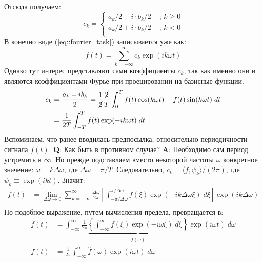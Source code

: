 Отсюда получаем:
\begin{equation}
	c_k = \left\{
	\begin{array}{rl}
		a_k / 2 - i \cdot b_k/ 2  & \text{ ; } k \ge 0\\ 
		a_k / 2 + i \cdot b_k/ 2  & \text{ ; } k < 0\\ 
	\end{array}
	\right.
\end{equation}
В конечно виде (\ref{eq::fourier_task}) записывается уже как:
\begin{equation}
	f(t) = \sum_{k = -\infty}^{\infty} c_k \exp(i k \omega t)
\end{equation}
Однако тут интерес представляют сами коэффициенты $c_k$, так как именно они и являются коэффициентами Фурье при проецировании на базисные функции. 
\begin{equation}
	\begin{split}
		c_k & = \frac{a_k - i b_k}{2} = \frac{1}{\cancel{2}} \frac{\cancel{2}}{T} \int_0^T f(t) \cos(k \omega t) - f(t) \sin(k \omega t) \; dt\\
		& = \frac{1}{2 T} \int_{-T}^T f(t) \exp(-i k \omega t) \; dt
	\end{split}
\end{equation}
Вспоминаем, что ранее вводилась предпосылка, относительно периодичности сигнала $f(t)$. \textbf{Q}: Как быть в противном случае? \textbf{A}: Необходимо сам период устремить к $\infty$. Но прежде подставляем вместо некоторой частоты $\omega$ конкретное значение: $\omega = k \Delta \omega$, где $\Delta \omega = \pi / T$. Следовательно, $c_k = \langle f, \psi_k\rangle / (2 \pi)$, где $\psi_k \equiv \exp(i k t)$. Значит:
\begin{equation}
	\begin{split}
		f(t) & = \lim_{\Delta \omega \to 0} \sum_{k = -\infty}^{\infty} \frac{\Delta \omega}{2 \pi} \left[\int_{-\pi / \Delta \omega}^{\pi / \Delta \omega} f(\xi) \exp(-i k \Delta \omega \xi) \; d \xi\right] \exp(i k \Delta \omega)\\
	\end{split}	
\end{equation}
Но подобное выражение, путем вычисления предела, превращается в:
\begin{equation}
	\begin{split}
		f(t) & = \int_{-\infty}^{\infty} \frac{1}{2\pi} \underbrace{\left\{\int_{-\infty}^{\infty} f(\xi) \exp(-i \omega \xi) \; d \xi \right\}}_{\hat{f}(\omega)} \exp(i \omega t) \; d \omega\\
		f(t) & = \frac{1}{2 \pi} \int_{-\infty}^{\infty} \hat{f}(\omega) \exp(i \omega t) \; d\omega
	\end{split}
\end{equation}
